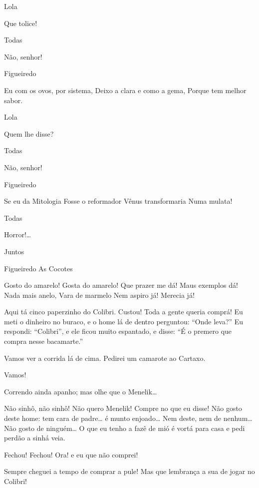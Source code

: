  Lola

 Que tolice!

 Todas

 Não, senhor!

 Figueiredo

 Eu com os ovos, por sistema, 
 Deixo a clara e como a gema, 
 Porque tem melhor sabor.

 Lola

 Quem lhe disse?

 Todas

 Não, senhor!

 Figueiredo

 Se eu da Mitologia 
 Fosse o reformador 
 Vênus transformaria 
 Numa mulata!

 Todas

 Horror!\ldots{}

 Juntos

 Figueiredo As Cocotes

 Gosto do amarelo! Gosta do amarelo! 
 Que prazer me dá! Maus exemplos dá! 
 Nada mais anelo, Vara de marmelo 
 Nem aspiro já! Merecia já!

  Aqui tá cinco paperzinho do Colibri. Custou! Toda a
gente queria comprá! Eu meti o dinheiro no buraco, e o home lá de dentro
perguntou: “Onde leva?” Eu respondi: “Colibri”, e ele ficou muito espantado, e disse:
“É o premero que compra nesse bacamarte.”

 Vamos ver a corrida lá de cima. Pedirei um camarote ao
Cartaxo.

 Vamos! 


  Correndo ainda apanho; mas olhe que o Menelik\ldots{} 

 Não sinhô, não sinhô! Não quero Menelik! Compre no que eu disse!
 Não gosto deste home: tem cara de padre\ldots{} é munto
enjoado\ldots{} Nem deste, nem de nenhum\ldots{} Não gosto de ninguém\ldots{} O que eu tenho a fazê
de mió é vortá para casa e pedi perdão a sinhá veia. 

 Fechou! Fechou! Ora! e eu que não comprei! 

  Sempre cheguei a tempo de comprar a pule!  Mas que lembrança a sua de jogar no Colibri!

